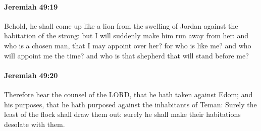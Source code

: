 		\paragraph{Jeremiah 49:19} %
			\label{JEREMIAH-49-19}

			Behold, he shall come up like a lion from the swelling of Jordan against the habitation of the strong: but I will suddenly make him run away from her: and who is a chosen man, that I may appoint over her? for who is like me? and who will appoint me the time? and who is that shepherd that will stand before me?


		\paragraph{Jeremiah 49:20} %
			\label{JEREMIAH-49-20}

			Therefore hear the counsel of the LORD, that he hath taken against Edom; and his purposes, that he hath purposed against the inhabitants of Teman: Surely the least of the flock shall draw them out: surely he shall make their habitations desolate with them.

